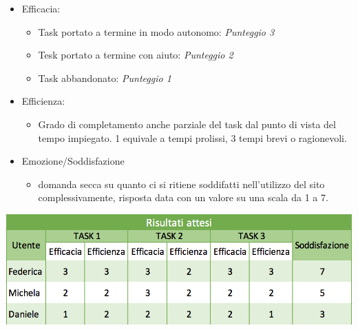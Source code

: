 \documentclass[12pt,a4paper]{report}
\begin{document}
  \begin{itemize}
  \item Efficacia:
    \begin{itemize}
    \item Task portato a termine in modo autonomo: \textit{Punteggio 3}
    \item Tesk portato a termine con aiuto: \textit{Punteggio 2}
    \item Task abbandonato: \textit{Punteggio 1}
    \end{itemize}
  \item Efficienza:
    \begin{itemize}
    \item Grado di completamento anche parziale del task dal punto di vista del tempo impiegato. 1 equivale a tempi prolissi, 3 tempi brevi o ragionevoli.
    \end{itemize}
  \item Emozione/Soddisfazione
    \begin{itemize}
    \item domanda secca su quanto ci si ritiene soddifatti nell'utilizzo del sito complessivamente, risposta data con un valore su una scala da 1 a 7.
    \end{itemize}
  \end{itemize}
  \includegraphics[width=1\textwidth]{"Project Management Sources/RisultatiAttesi"}
\end{document}
